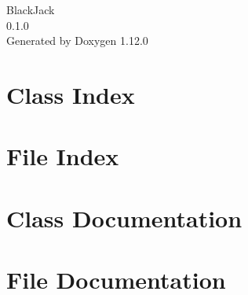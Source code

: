 \documentclass[twoside]{book}
\newcommand{\+}{\discretionary{\mbox{\scriptsize$\hookleftarrow$}}{}{}}
\newcommand{\clearemptydoublepage}{%
    \newpage{\pagestyle{empty}\cleardoublepage}%
  }
\begin{document}
  \raggedbottom
    \hypersetup{pageanchor=false,
                bookmarksnumbered=true,
                pdfencoding=unicode
               }
  \begin{titlepage}
  \vspace*{7cm}
  \begin{center}%
  {\Large Black\+Jack}\\
  [1ex]\large 0.\+1.\+0 \\
  \vspace*{1cm}
  {\large Generated by Doxygen 1.12.0}\\
  \end{center}
  \end{titlepage}
  \clearemptydoublepage
  \tableofcontents
  \clearemptydoublepage
  \hypersetup{pageanchor=true}

\chapter{Class Index}

\chapter{File Index}

\chapter{Class Documentation}



\chapter{File Documentation}







  \backmatter
  \newpage
  \clearemptydoublepage
  \printindex
\end{document}
